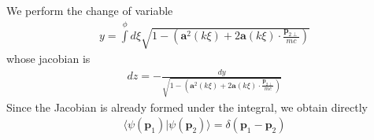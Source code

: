 We perform the change of variable
\begin{align}
    y=\int\limits^{\phi}d\xi\sqrt{1-\left({\bm a}^2(k\xi)+2{\bm a}(k\xi)\cdot\frac{\bm p_{2\perp}}{mc}\right)}
\end{align}
whose jacobian is
\begin{align}
    dz = -\frac{dy}{\sqrt{1-\left({\bm a}^2(k\xi)+2{\bm a}(k\xi)\cdot\frac{\bm p_{2\perp}}{mc}\right)}}
\end{align}
Since the Jacobian is already formed under the integral, we obtain directly
\begin{align}
    \langle\psi({\bm p}_1)|\psi({\bm p}_2)\rangle=\delta({\bm p}_1-{\bm p}_2)
\end{align}

